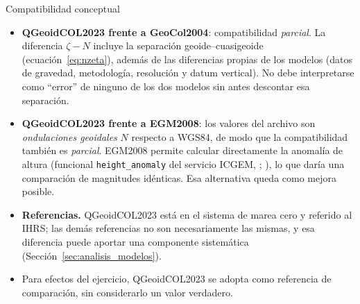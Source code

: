 \documentclass[11pt,letterpaper]{article}
\begin{document}
\begin{analisisBox}{Compatibilidad conceptual}
\begin{itemize}
    \item \textbf{QGeoidCOL2023 frente a GeoCol2004}: compatibilidad \emph{parcial}. La
    diferencia $\zeta-N$ incluye la separación geoide--cuasigeoide
    (ecuación~\eqref{eq:nzeta}), además de las diferencias propias de los modelos (datos de
    gravedad, metodología, resolución y datum vertical). No debe interpretarse como ``error'' de
    ninguno de los dos modelos sin antes descontar esa separación.
    \item \textbf{QGeoidCOL2023 frente a EGM2008}: los valores del archivo son \emph{ondulaciones
    geoidales} $N$ respecto a WGS84, de modo que la compatibilidad también es \emph{parcial}. EGM2008
    permite calcular directamente la anomalía de altura (funcional \texttt{height\_anomaly} del
    servicio ICGEM, \citealp{ince2019}; \citealp{barthelmes2013}), lo que daría una comparación de
    magnitudes idénticas. Esa alternativa queda como mejora posible.
    \item \textbf{Referencias.} QGeoidCOL2023 está en el sistema de marea cero y referido al IHRS;
    las demás referencias no son necesariamente las mismas, y esa diferencia puede aportar una
    componente sistemática (Sección~\ref{sec:analisis_modelos}).
    \item Para efectos del ejercicio, QGeoidCOL2023 se adopta como referencia de
    comparación, sin considerarlo un valor verdadero.
\end{itemize}
\end{analisisBox}
\end{document}
